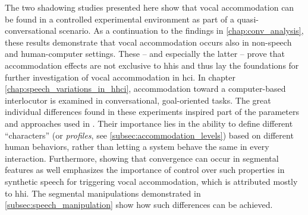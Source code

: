 The two shadowing studies presented here show that vocal accommodation can be found in a controlled experimental environment as part of a quasi-conversational scenario.
As a continuation to the findings in \cref{chap:conv_analysis}, these results demonstrate that vocal accommodation occurs also in non-speech and human-computer settings.
These -- and especially the latter -- prove that accommodation effects are not exclusive to \acp{hhi} and thus lay the foundations for further investigation of vocal accommodation in \ac{hci}.
In chapter \cref{chap:speech_variations_in_hhci}, accommodation toward a computer-based interlocutor is examined in conversational, goal-oriented tasks.
The great individual differences found in these experiments inspired part of the parameters and approaches used in .
Their importance lies in the ability to define different \enquote{characters} (or \emph{profiles}, see \cref{subsec:accommodation_levels}) based on different human behaviors, rather than letting a system behave the same in every interaction.
Furthermore, showing that convergence can occur in segmental features as well emphasizes the importance of control over such properties in synthetic speech for triggering vocal accommodation, which is attributed mostly to \ac{hhi}.
The segmental manipulations demonstrated in \cref{subsec:speech_manipulation} show how such differences can be achieved.